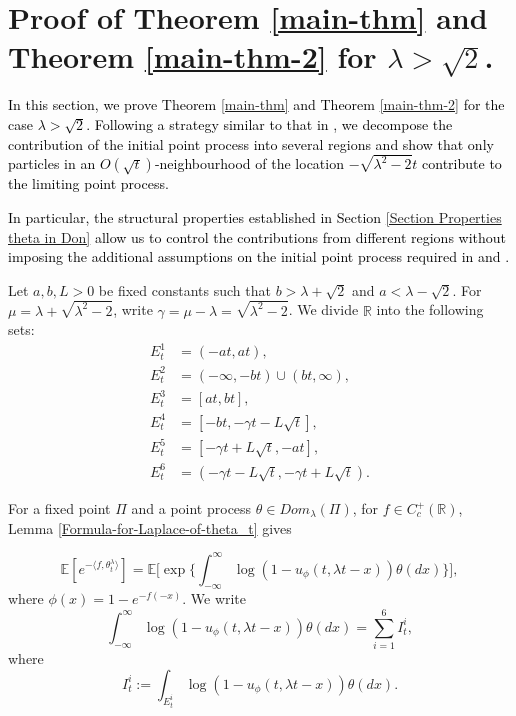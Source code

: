 \documentclass[a4paper,reqno]{amsart}%
\newcommand{\1}{\mathbf 1}
\theoremstyle{mine}
\numberwithin{theorem}{section}
\numberwithin{equation}{section}
\theoremstyle{remark}
\begin{document}
\section{Proof of Theorem \ref{main-thm} and Theorem \ref{main-thm-2} for $\lambda >\sqrt{2}$.} \label{Section proof supercritical}

\textcolor{black}{In this section, we prove Theorem \ref{main-thm} and Theorem \ref{main-thm-2} for the case $\lambda>\sqrt{2}$. Following a strategy similar to that in \cite{Shekhar_FP}, we decompose the contribution of the initial point process into several regions and show that only particles in an $O(\sqrt{t})$-neighbourhood of the location $-\sqrt{\lambda^2-2}t$ contribute to the limiting point process.}

\textcolor{black}{In particular, the structural properties established in Section \ref{Section Properties theta in Don} allow us to control the contributions from different regions without imposing the additional assumptions on the initial point process required in \cite{Shekhar_FP} and \cite{Shekhar_Domain}.}


Let $a, b, L>0$ be fixed constants such that $b>\lambda + \sqrt{2}$ and $a < \lambda - \sqrt{2}$. For $\mu = \lambda + \sqrt{\lambda^2 -2 }$, write $\gamma = \mu - \lambda = \sqrt{\lambda^2 -2}$. We divide $\mathbb{R}$ into the following sets: 
\begin{align}
    \nonumber E_t^1 &= (-at, at), \\ \nonumber
    E_t^2 &= (-\infty, -bt)\cup (bt, \infty), \\ \label{Def-sets-E} 
    E_t^3 &= [at,bt], \\ \nonumber
    E_t^4 &= [-bt, -\gamma  t -L\sqrt{t}], \\ \nonumber
    E_t^5 &= [-\gamma t + L\sqrt{t}, -at], \\ \nonumber
    E_t^6 &= (-\gamma t - L\sqrt{t}, -\gamma t + L\sqrt{t}).  
\end{align}

For a fixed point $\Pi$ and a point process $\theta \in Dom_{\lambda}(\Pi)$, for $f\in C_c^+(\mathbb{R})$, Lemma \ref{Formula-for-Laplace-of-theta_t} gives  

\begin{equation}\label{Laplace-comp-using-F-KPP-3}
\mathbb{E}[e^{-\langle f,\theta_t^\lambda\rangle}] = \mathbb{E}\biggl[\exp\biggl\{\int_{-\infty}^\infty\log(1- u_\phi(t, \lambda t -x))\theta(dx)\biggr\}\biggr],
\end{equation}
where $\phi(x) = 1-e^{-f(-x)}$. We write 
\begin{equation}
    \int_{-\infty}^\infty\log(1- u_\phi(t, \lambda t -x))\theta(dx) = \sum_{i=1}^6 I_t^i,
\end{equation}
where
\begin{equation}
   I_t^i :=  \int_{E_t^i}\log(1- u_\phi(t, \lambda t -x))\theta(dx).
\end{equation}
\end{document}
